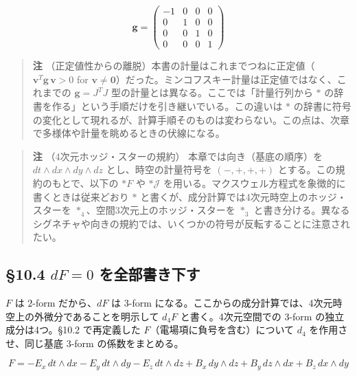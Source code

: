 \documentclass[a4paper,12pt,openany]{book}
\begin{document}
\[\mathbf{g} = \begin{pmatrix}
-1 & 0 & 0 & 0 \\
0 & 1 & 0 & 0 \\
0 & 0 & 1 & 0 \\
0 & 0 & 0 & 1
\end{pmatrix}\]

\begin{quote}
\textbf{注}
（正定値性からの離脱）本書の計量はこれまでつねに正定値（\(\mathbf{v}^T\mathbf{g}\,\mathbf{v} > 0\)
for
\(\mathbf{v}\neq\mathbf{0}\)）だった。ミンコフスキー計量は正定値ではなく、これまでの
\(\mathbf{g}=J^T J\) 型の計量とは異なる。ここでは「計量行列から \(\ast\)
の辞書を作る」という手順だけを引き継いでいる。この違いは \(\ast\)
の辞書に符号の変化として現れるが、計算手順そのものは変わらない。この点は、次章で多様体や計量を眺めるときの伏線になる。
\end{quote}

\begin{quote}
\textbf{注} （4次元ホッジ・スターの規約） 本章では向き（基底の順序）を
\(dt\wedge dx\wedge dy\wedge dz\) とし、時空の計量符号を \((-,+,+,+)\)
とする。この規約のもとで、以下の \(\ast F\) や \(\ast\mathcal{J}\)
を用いる。マクスウェル方程式を象徴的に書くときは従来どおり \(\ast\)
と書くが、成分計算では4次元時空上のホッジ・スターを
\(\ast_4\)、空間3次元上のホッジ・スターを \(\ast_3\)
と書き分ける。異なるシグネチャや向きの規約では、いくつかの符号が反転することに注意されたい。
\end{quote}

\par\vspace{0.35em}\par

\hypertarget{df0-ux3092ux5168ux90e8ux66f8ux304dux4e0bux3059}{%
\subsection{\texorpdfstring{§10.4 \(dF=0\)
を全部書き下す}{§10.4 dF=0 を全部書き下す}}\label{df0-ux3092ux5168ux90e8ux66f8ux304dux4e0bux3059}}

\(F\) は \(2\)-form だから、\(dF\) は \(3\)-form
になる。ここからの成分計算では、4次元時空上の外微分であることを明示して
\(d_4F\) と書く。4次元空間での \(3\)-form の独立成分は4つ。§10.2
で再定義した \(F\)（電場項に負号を含む）について \(d_4\)
を作用させ、同じ基底 \(3\)-form の係数をまとめる。

\[F = -E_x\,dt\wedge dx - E_y\,dt\wedge dy - E_z\,dt\wedge dz + B_x\,dy\wedge dz + B_y\,dz\wedge dx + B_z\,dx\wedge dy\]
\end{document}
